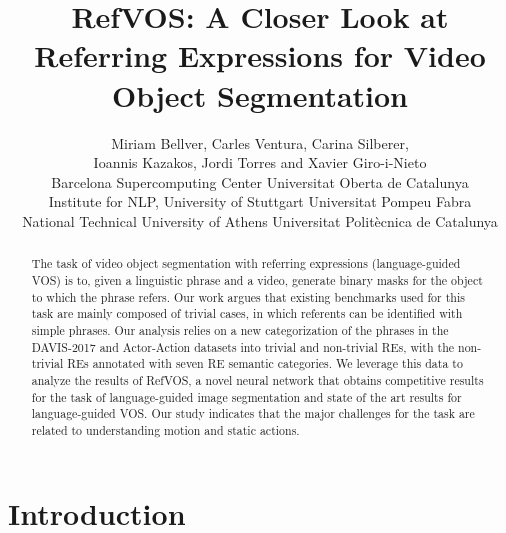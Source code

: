 \documentclass[10pt,twocolumn,letterpaper]{article}
\begin{document}
\title{RefVOS: A Closer Look at Referring Expressions for Video Object Segmentation}
















\author{Miriam Bellver,  Carles Ventura,  Carina Silberer, \\ Ioannis Kazakos, Jordi Torres and Xavier Giro-i-Nieto \vspace{4mm} \\ 
Barcelona Supercomputing Center  \:\:\:
Universitat Oberta de Catalunya  \:\:\: \\
Institute for NLP, University of Stuttgart \:\:\: 
Universitat Pompeu Fabra \:\:\:  \\
National Technical University of Athens \:\:\: 
Universitat Politècnica de Catalunya \:\:\:
}

\maketitle


\begin{abstract}
The task of video object segmentation with referring expressions (language-guided VOS) is to, given a linguistic phrase and a video, generate binary masks for the object to which the phrase refers. Our work argues that existing benchmarks used for this task are mainly composed of trivial cases, in which referents can be identified with simple phrases. Our analysis relies on a new categorization of the phrases in the DAVIS-2017 and Actor-Action datasets into trivial and non-trivial REs, with the non-trivial REs annotated with seven RE semantic categories. We leverage this data to analyze the results of RefVOS, a novel neural network that obtains competitive results for the task of language-guided image segmentation and state of the art results for language-guided VOS. Our study indicates that the major challenges for the task are related to understanding motion and static actions.
\end{abstract}

\section{Introduction}
\label{sec:introduction}
\end{document}
